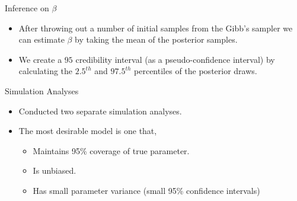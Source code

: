 \documentclass[
  ignorenonframetext,
]{beamer}
\providecommand{\tightlist}{%
  \setlength{\itemsep}{0pt}\setlength{\parskip}{0pt}}
\begin{document}
\begin{frame}{Inference on \(\beta\)}
\protect\hypertarget{inference-on-beta}{}
\begin{itemize}
\tightlist
\item
  After throwing out a number of initial samples from the Gibb's sampler
  we can estimate \(\beta\) by taking the mean of the posterior samples.
\item
  We create a \(95%
  \) credibility interval (as a pseudo-confidence interval) by
  calculating the \(2.5^{th}\) and \(97.5^{th}\) percentiles of the
  posterior draws.
\end{itemize}
\end{frame}

\begin{frame}{Simulation Analyses}
\protect\hypertarget{simulation-analyses}{}
\begin{itemize}
\tightlist
\item
  Conducted two separate simulation analyses.
\item
  The most desirable model is one that,

  \begin{itemize}
  \tightlist
  \item
    Maintains 95\% coverage of true parameter.
  \item
    Is unbiased.
  \item
    Has small parameter variance (small 95\% confidence intervals)
  \end{itemize}
\end{itemize}
\end{frame}
\end{document}
